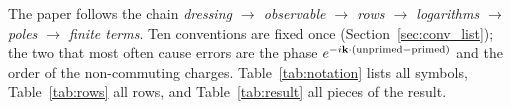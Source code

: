 \begin{summarybox}
The paper follows the chain \emph{dressing $\to$ observable $\to$ rows $\to$ logarithms $\to$ poles $\to$ finite terms}. Ten conventions are fixed once (Section~\ref{sec:conv_list}); the two that most often cause errors are the phase $e^{-i\mathbf{k}\cdot(\text{unprimed}-\text{primed})}$ and the order of the non-commuting charges. Table~\ref{tab:notation} lists all symbols, Table~\ref{tab:rows} all rows, and Table~\ref{tab:result} all pieces of the result.
\end{summarybox}
